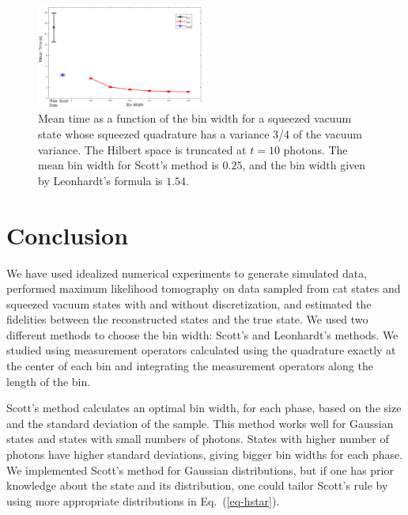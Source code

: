 \documentclass[
reprint,
superscriptaddress,
showpacs,
amsmath,
amssymb,
aps,
pra,
longbibliography
]{revtex4-1}
\begin{document}
\begin{figure}
  \includegraphics[width=0.49\textwidth]{time-vacuocomprimido.eps}
  \caption{Mean time as a function of the bin width for a squeezed
    vacuum state whose squeezed quadrature has a variance 3/4 of the
    vacuum variance. The Hilbert space is truncated at $t=10$ photons. The
    mean bin width for Scott's method is $0.25$, and the bin width
    given by Leonhardt's formula is $1.54$.}
  \label{fig-time-squeezed}
\end{figure}



\section{Conclusion}
\label{conclusion}

We have used idealized numerical experiments to generate simulated
data, performed maximum likelihood tomography on data sampled
from cat states and squeezed vacuum states with and without
discretization, and estimated the fidelities between
the reconstructed states and the true state. We used two different
methods to choose the bin width: Scott's and Leonhardt's methods. We
studied using measurement operators calculated using the
quadrature exactly at the center of each bin and integrating the
measurement operators along the length of the bin. 

Scott's method calculates an optimal bin width, for each phase, based
on the size and the standard deviation of the sample. This method
works well for Gaussian states and states
with small numbers of photons.  States with higher number of photons
have higher standard deviations, giving bigger bin widths for each
phase. We implemented Scott's method for Gaussian distributions,
but if one has prior knowledge about the state and its distribution, 
one could tailor Scott's rule by using more appropriate distributions in
Eq.~(\ref{eq-hstar}).  
\end{document}
